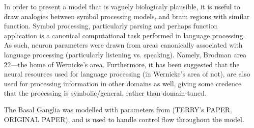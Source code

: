 \documentclass[journal]{IEEEtran}
\begin{document}
In order to present a model that is vaguely biologicaly plausible, it is useful to draw analogies between symbol processing models, and brain regions with similar function.
Symbol processing, particularly parsing and perhaps function application is a canonical computational task performed in language processing.
As such, neuron parameters were drawn from areas canonically associated with language processing (particularly listening vs. speaking).
Namely, Brodman area 22---the home of Wernicke's area.
Furthermore, it has been suggested that the neural resources used for language processing (in Wernicke's area of not), are also used for processing information in other domains as well, giving some credence that the processing is symbolic/general, rather than domain-tuned.

The Basal Ganglia was modelled with parameters from (TERRY's PAPER, ORIGINAL PAPER), and is used to handle control flow throughout the model.










\end{document}
